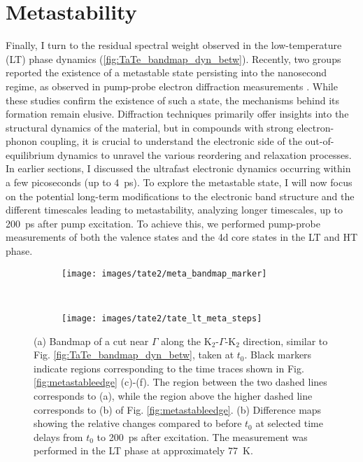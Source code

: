 \section{Metastability}
\label{sec:meta}

Finally, I turn to the residual spectral weight observed in the low-temperature (LT) phase dynamics (\ref{fig:TaTe_bandmap_dyn_betw}).
Recently, two groups reported the existence of a metastable state persisting into the nanosecond regime, as observed in pump-probe electron diffraction measurements \cite{siddiqui_ultrafast_2021, domrose_femtosecond_2024}.
While these studies confirm the existence of such a state, the mechanisms behind its formation remain elusive.
Diffraction techniques primarily offer insights into the structural dynamics of the material, but in compounds with strong electron-phonon coupling, it is crucial to understand the electronic side of the out-of-equilibrium dynamics to unravel the various reordering and relaxation processes.
In earlier sections, I discussed the ultrafast electronic dynamics occurring within a few picoseconds (up to \qty{4}{\pico\second}).
To explore the metastable state, I will now focus on the potential long-term modifications to the electronic band structure and the different timescales leading to metastability, analyzing longer timescales, up to \qty{200}{\pico\second} after pump excitation.
To achieve this, we performed pump-probe measurements of both the valence states and the  4d core states in the LT and HT phase.

\begin{figure}[th!]
	\centering
	\begin{subfigure}[b]{0.25\textwidth}
		\texttt{[image: images/tate2/meta\_bandmap\_marker]}
		\caption{}
	\end{subfigure}
	\\
	\begin{subfigure}[b]{\textwidth}
		\texttt{[image: images/tate2/tate\_lt\_meta\_steps]}
		\caption{}
	\end{subfigure}
	\caption{(a) Bandmap of a cut near $\Gamma$ along the K$_2$-$\Gamma$-K$_2$ direction, similar to Fig. \ref{fig:TaTe_bandmap_dyn_betw}, taken at $t_0$. Black markers indicate regions corresponding to the time traces shown in Fig. \ref{fig:metastableedge} (c)-(f). The region between the two dashed lines corresponds to (a), while the region above the higher dashed line corresponds to (b) of Fig. \ref{fig:metastableedge}. (b) Difference maps showing the relative changes compared to before $t_0$ at selected time delays from $t_0$ to \qty{200}{\pico\second} after excitation. The measurement was performed in the LT phase at approximately \qty{77}{\kelvin}.}
	\label{fig:tateltmetasteps}
\end{figure}

